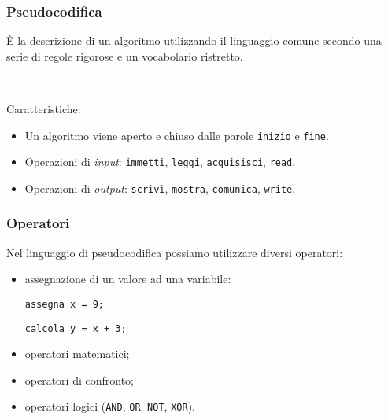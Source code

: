 \documentclass[]{beamer}
\begin{document}
\begin{frame}
\frametitle{Pseudocodifica}
È la descrizione di un algoritmo utilizzando il linguaggio comune secondo una serie di \alert<1>{regole rigorose} e un \alert<1>{vocabolario ristretto}.\pause

~

Caratteristiche:
\begin{itemize}
  \item Un algoritmo viene aperto e chiuso dalle parole \alert{\texttt{inizio}} e \alert{\texttt{fine}}.\pause
  \item Operazioni di \emph{input}: \texttt{immetti}, \texttt{leggi}, \texttt{acquisisci}, \texttt{read}.
  \item Operazioni di \emph{output}: \texttt{scrivi}, \texttt{mostra}, \texttt{comunica}, \texttt{write}.
\end{itemize}
\end{frame}

\begin{frame}
\frametitle{Operatori}
Nel linguaggio di pseudocodifica possiamo utilizzare diversi operatori:
\begin{itemize}
  \item assegnazione di un valore ad una variabile:
  \begin{center}
  \texttt{assegna x = 9;}
  
  \texttt{calcola y = x + 3;}
  \end{center}\pause
  \item operatori matematici;\pause
  \item operatori di confronto;\pause
  \item operatori logici (\texttt{AND}, \texttt{OR}, \texttt{NOT}, \texttt{XOR}).
\end{itemize}
\end{frame}
\end{document}
